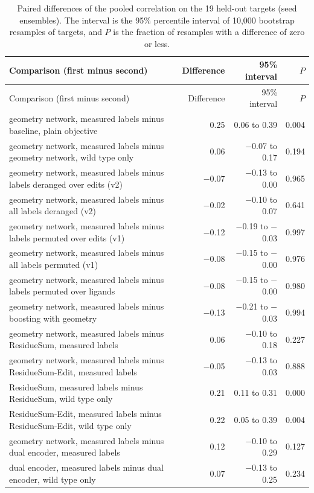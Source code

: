 \begin{longtable}{p{8.6cm}rrr}
\caption{Paired differences of the pooled correlation on the 19 held-out targets (seed ensembles). The interval is the 95\% percentile interval of 10{,}000 bootstrap resamples of targets, and $P$ is the fraction of resamples with a difference of zero or less.}
\label{tab:si_pairs}\\
\toprule
Comparison (first minus second) & Difference & 95\% interval & $P$ \\
\midrule
\endfirsthead
Comparison (first minus second) & Difference & 95\% interval & $P$ \\
\midrule
\endhead
geometry network, measured labels minus baseline, plain objective & 0.25 & 0.06 to 0.39 & 0.004 \\
geometry network, measured labels minus geometry network, wild type only & 0.06 & $-$0.07 to 0.17 & 0.194 \\
geometry network, measured labels minus labels deranged over edits (v2) & $-$0.07 & $-$0.13 to 0.00 & 0.965 \\
geometry network, measured labels minus all labels deranged (v2) & $-$0.02 & $-$0.10 to 0.07 & 0.641 \\
geometry network, measured labels minus labels permuted over edits (v1) & $-$0.12 & $-$0.19 to $-$0.03 & 0.997 \\
geometry network, measured labels minus all labels permuted (v1) & $-$0.08 & $-$0.15 to $-$0.00 & 0.976 \\
geometry network, measured labels minus labels permuted over ligands & $-$0.08 & $-$0.15 to $-$0.00 & 0.980 \\
geometry network, measured labels minus boosting with geometry & $-$0.13 & $-$0.21 to $-$0.03 & 0.994 \\
geometry network, measured labels minus ResidueSum, measured labels & 0.06 & $-$0.10 to 0.18 & 0.227 \\
geometry network, measured labels minus ResidueSum-Edit, measured labels & $-$0.05 & $-$0.13 to 0.03 & 0.888 \\
ResidueSum, measured labels minus ResidueSum, wild type only & 0.21 & 0.11 to 0.31 & 0.000 \\
ResidueSum-Edit, measured labels minus ResidueSum-Edit, wild type only & 0.22 & 0.05 to 0.39 & 0.004 \\
geometry network, measured labels minus dual encoder, measured labels & 0.12 & $-$0.10 to 0.29 & 0.127 \\
dual encoder, measured labels minus dual encoder, wild type only & 0.07 & $-$0.13 to 0.25 & 0.234 \\

\end{longtable}
